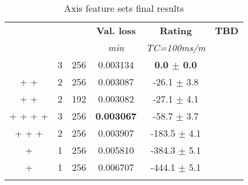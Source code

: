 
    \begin{table}[H]
\caption{Axis feature sets final results}
\centering
\begin{adjustbox}{center}
\begin{tabular}{@{} cccccc @{}}
\toprule
\bf {} & \bf {} & \bf {} & \bf Val. loss  & \bf Rating & \bf TBD \\
 &  &  & \textit{min}  & \textit{TC=100ms/m} &  \\
\midrule
     & 3 & 256 & 0.003134 & \bf0.0 $\pm$ 0.0\\
 +  +  & 2 & 256 & 0.003087 & -26.1 $\pm$ 3.8\\
 +  +  & 2 & 192 & 0.003082 & -27.1 $\pm$ 4.1\\
 +  +  +  +  & 3 & 256 & \bf0.003067 & -58.7 $\pm$ 3.7\\
 +  +  +  & 2 & 256 & 0.003907 & -183.5 $\pm$ 4.1\\
 +  & 1 & 256 & 0.005810 & -384.3 $\pm$ 5.1\\
 +  & 1 & 256 & 0.006707 & -444.1 $\pm$ 5.1\\
\toprule
{} \\
\end{tabular}
\end{adjustbox}
\end{table}
